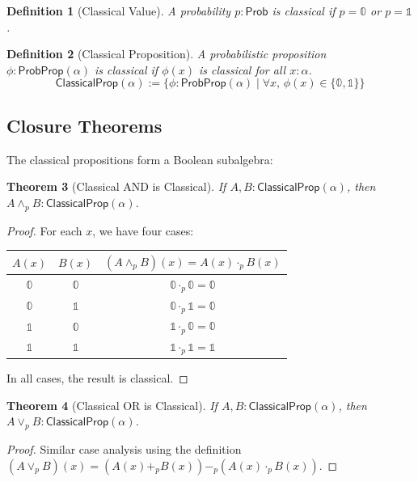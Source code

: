 \documentclass[11pt,a4paper]{article}
\newtheorem{theorem}{Theorem}[section]
\newtheorem{definition}[theorem]{Definition}
\newcommand{\Prob}{\mathsf{Prob}}
\newcommand{\ProbProp}{\mathsf{ProbProp}}
\newcommand{\pand}{\wedge_p}
\newcommand{\por}{\vee_p}
\newcommand{\pzero}{\mathbb{0}}
\newcommand{\pone}{\mathbb{1}}
\newcommand{\padd}{+_p}
\newcommand{\pmul}{\cdot_p}
\newcommand{\psub}{-_p}
\begin{document}
\begin{definition}[Classical Value]
A probability $p : \Prob$ is \emph{classical} if $p = \pzero$ or $p = \pone$.
\end{definition}

\begin{definition}[Classical Proposition]
A probabilistic proposition $\phi : \ProbProp(\alpha)$ is \emph{classical} if $\phi(x)$ is classical for all $x : \alpha$.
\[
\mathsf{ClassicalProp}(\alpha) := \{ \phi : \ProbProp(\alpha) \mid \forall x,\, \phi(x) \in \{\pzero, \pone\} \}
\]
\end{definition}

\subsection{Closure Theorems}

The classical propositions form a Boolean subalgebra:

\begin{theorem}[Classical AND is Classical]
If $A, B : \mathsf{ClassicalProp}(\alpha)$, then $A \pand B : \mathsf{ClassicalProp}(\alpha)$.
\end{theorem}

\begin{proof}
For each $x$, we have four cases:
\begin{center}
\begin{tabular}{cc|c}
$A(x)$ & $B(x)$ & $(A \pand B)(x) = A(x) \pmul B(x)$ \\
\midrule
$\pzero$ & $\pzero$ & $\pzero \pmul \pzero = \pzero$ \\
$\pzero$ & $\pone$ & $\pzero \pmul \pone = \pzero$ \\
$\pone$ & $\pzero$ & $\pone \pmul \pzero = \pzero$ \\
$\pone$ & $\pone$ & $\pone \pmul \pone = \pone$
\end{tabular}
\end{center}
In all cases, the result is classical.
\end{proof}

\begin{theorem}[Classical OR is Classical]
If $A, B : \mathsf{ClassicalProp}(\alpha)$, then $A \por B : \mathsf{ClassicalProp}(\alpha)$.
\end{theorem}

\begin{proof}
Similar case analysis using the definition $(A \por B)(x) = (A(x) \padd B(x)) \psub (A(x) \pmul B(x))$.
\end{proof}
\end{document}
